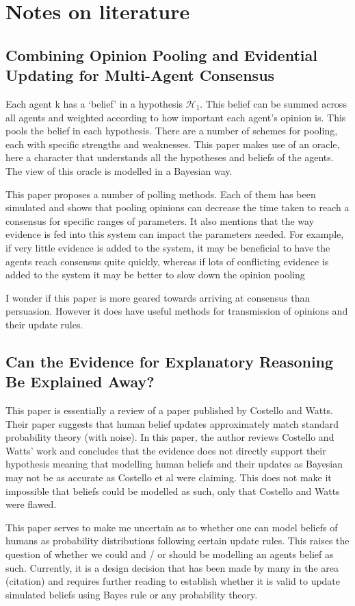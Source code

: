 \section{Notes on literature}
\subsection{Combining Opinion Pooling and Evidential Updating for Multi-Agent Consensus\cite{Lee2017CombiningConsensus}}

Each agent k has a `belief' in a hypothesis $\mathcal{H_1}$. This belief can be summed across all agents and weighted according to how important each agent's opinion is. This pools the belief in each hypothesis. There are a number of schemes for pooling, each with specific strengths and weaknesses. This paper makes use of an oracle, here a character that understands all the hypotheses and beliefs of the agents. The view of this oracle is modelled in a Bayesian way. 

This paper proposes a number of polling methods. Each of them has been simulated and shows that pooling opinions can decrease the time taken to reach a consensus for specific ranges of parameters. It also mentions that the way evidence is fed into this system can impact the parameters needed. For example, if very little evidence is added to the system, it may be beneficial to have the agents reach consensus quite quickly, whereas if lots of conflicting evidence is added to the system it may be better to slow down the opinion pooling

I wonder if this paper is more geared towards arriving at consensus than persuasion. However it does have useful methods for transmission of opinions and their update rules. 

\subsection{Can the Evidence for Explanatory Reasoning
Be Explained Away?\cite{Zadeh1986ACombination}}

This paper is essentially a review of a paper published by Costello and Watts. Their paper suggests that human belief updates approximately match standard probability theory (with noise). In this paper, the author reviews Costello and Watts' work and concludes that the evidence does not directly support their hypothesis meaning that modelling human beliefs and their updates as Bayesian may not be as accurate as Costello et al were claiming. This does not make it impossible that beliefs could be modelled as such, only that Costello and Watts were flawed.

This paper serves to make me uncertain as to whether one can model beliefs of humans as probability distributions following certain update rules. This raises the question of whether we could and / or should be modelling an agents belief as such. Currently, it is a design decision that has been made by many in the area (citation) and requires further reading to establish whether it is valid to update simulated beliefs using Bayes rule or any probability theory.